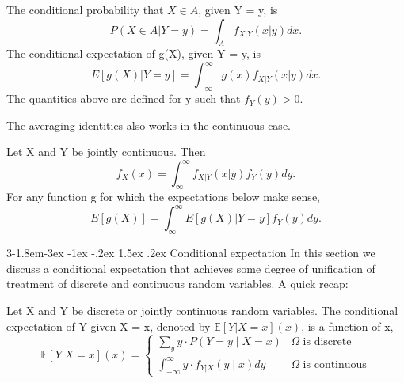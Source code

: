 \documentclass{tufte-handout}
\makeatletter
\renewcommand{\subsection}{\@startsection{subsection}%
    {3}{-1.8em}{-3ex \@plus -1ex \@minus -.2ex}%
    {1.5ex \@plus .2ex}
    {\hspace*{-5.5em}\fcolorbox{ltblue}{ltblue}{\parbox[c][1.0ex][b]{4em}{\phantom{space}}}
    \normalfont\large\itshape\color{ltblue}}}
\makeatother
\begin{document}
    \begin{Definition}
        The conditional probability that $ X \in A  $, given Y = y, is 
        \[P(X\in A|Y=y)=\int_A f_{X|Y}(x|y)dx.\]
        The conditional expectation of g(X), given Y = y, is
        \[E[g(X)|Y=y]=\int_{-\infty}^{\infty}g(x)f_{X|Y }(x|y)dx.\]
        The quantities above are defined for y such that $ f_Y(y)>0 $.
    \end{Definition}

    The averaging identities also works in the continuous case.

    \begin{Theorem}
        Let X and Y be jointly continuous. Then
        \[f_X(x) =\int_{\infty}^{\infty}f_{X|Y}(x|y)f_Y(y)dy. \]
        For any function g for which the expectations below make sense,
        \[E[g(X)]=\int_{\infty}^{\infty}E[g(X)|Y=y]f_Y(y)dy.\]
    \end{Theorem}


    \subsection{Conditional expectation}
    In this section we discuss a conditional expectation that achieves some degree of unification of 
    treatment of discrete and continuous random variables. A quick recap:
    \begin{Definition}
        Let X and Y be discrete or jointly continuous random variables. 
        The conditional expectation of Y given X = x, denoted by $\mathbb{E }[Y|X=x ](x) $,
        is a function of x,
        \[\mathbb{E }[Y|X=x ](x) = 
        \begin{cases}
            \sum_y y \cdot P(Y = y \mid X = x) & \Omega \text{ is discrete} \\
            \int_{-\infty}^{\infty} y \cdot f_{Y|X}(y \mid x) dy & \Omega \text{ is continuous}
            \end{cases}\]
    \end{Definition}
\end{document}
